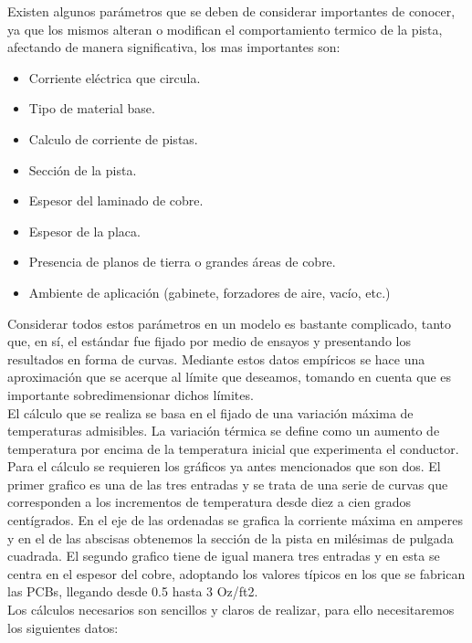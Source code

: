 Existen algunos parámetros que se deben de considerar importantes de conocer, ya que los mismos alteran o modifican el comportamiento termico de la pista, afectando de manera significativa, los mas importantes son:\\

\begin{itemize}
\item Corriente eléctrica que circula.
\item Tipo de material base.
\item Calculo de corriente de pistas.
\item Sección de la pista.
\item Espesor del laminado de cobre.
\item Espesor de la placa.
\item Presencia de planos de tierra o grandes áreas de cobre.
\item Ambiente de aplicación (gabinete, forzadores de aire, vacío, etc.)
\end{itemize}

Considerar todos estos parámetros en un modelo es bastante complicado, tanto que, en sí, el estándar fue fijado por medio de ensayos y presentando los resultados en forma de curvas. Mediante estos datos empíricos se hace una aproximación que se acerque al límite que deseamos, tomando en cuenta que es importante sobredimensionar dichos límites. \\

El cálculo que se realiza se basa en el fijado de una variación máxima de temperaturas admisibles. La variación térmica se define como un aumento de temperatura por encima de la temperatura inicial que experimenta el conductor. \\
Para el cálculo se requieren los gráficos ya antes mencionados que son dos. El primer grafico es una de las tres entradas y se trata de una serie de curvas que corresponden a los incrementos de temperatura desde diez a cien grados centígrados. En el eje de las ordenadas se grafica la corriente máxima en amperes y en el de las abscisas obtenemos la sección de la pista en milésimas de pulgada cuadrada. El segundo grafico tiene de igual manera tres entradas y en esta se centra en el espesor del cobre, adoptando los valores típicos en los que se fabrican las PCBs, llegando desde 0.5 hasta 3 Oz/ft2.\\

Los cálculos necesarios son sencillos y claros de realizar, para ello necesitaremos los siguientes datos:\\

